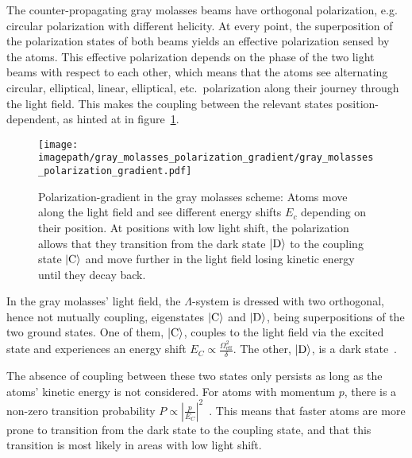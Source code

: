 The counter-propagating gray molasses beams have orthogonal polarization, e.g. circular polarization with different helicity. At every point, the superposition of the polarization states of both beams yields an effective polarization sensed by the atoms. This effective polarization depends on the phase of the two light beams with respect to each other, which means that the atoms see alternating circular, elliptical, linear, elliptical, etc.~polarization along their journey through the light field. This makes the coupling between the relevant states position-dependent, as hinted at in figure~\ref{fig:gray_molasses_polarization_gradient}.

\begin{figure}
    \centering
    \texttt{[image: \\imagepath/gray\_molasses\_polarization\_gradient/gray\_molasses\_polarization\_gradient.pdf]}
    \caption{Polarization-gradient in the gray molasses scheme: Atoms move along the light field and see different energy shifts $E_c$ depending on their position. At positions with low light shift, the polarization allows that they transition from the dark state $\Ket{\text{D}}$ to the coupling state $\Ket{\text{C}}$ and move further in the light field losing kinetic energy until they decay back.}
    \label{fig:gray_molasses_polarization_gradient}
\end{figure}

In the gray molasses' light field, the $\Lambda$-system is dressed with two orthogonal, hence not mutually coupling, eigenstates $\Ket{\text{C}}$ and $\Ket{\text{D}}$, being superpositions of the two ground states. One of them, $\Ket{\text{C}}$, couples to the light field via the excited state and experiences an energy shift $E_C \propto \frac{\Omega_\text{eff}^2}{\delta}$. The other, $\Ket{\text{D}}$, is a dark state~\cite{weidemuller_novel_1994,gerken_gray_2016}.

The absence of coupling between these two states only persists as long as the atoms' kinetic energy is not considered. For atoms with momentum $p$, there is a non-zero transition probability $P \propto \left|\frac{p}{E_C} \right|^2$~\cite{weidemuller_novel_1994}. This means that faster atoms are more prone to transition from the dark state to the coupling state, and that this transition is most likely in areas with low light shift.

